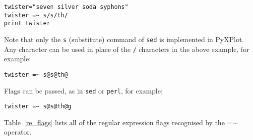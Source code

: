 \begin{verbatim}
twister="seven silver soda syphons"
twister =~ s/s/th/
print twister
\end{verbatim}

Note that only the {\tt s} (substitute) command of {\tt sed} is implemented in
PyXPlot. Any character can be used in place of the {\tt /} characters in the
above example, for example:

\begin{verbatim}
twister =~ s@s@th@
\end{verbatim}

\noindent Flags can be passed, as in {\tt sed} or {\tt perl}, for example:

\begin{verbatim}
twister =~ s@s@th@g
\end{verbatim}

\noindent Table~\ref{re_flags} lists all of the regular expression flags
recognised by the =$\sim$ operator.

